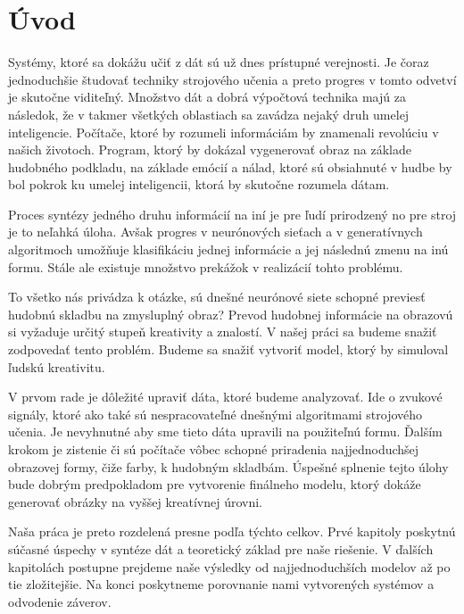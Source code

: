 

\chapter*{Úvod}

Systémy, ktoré sa dokážu učiť z dát sú už dnes prístupné verejnosti. Je čoraz jednoduchšie študovať techniky strojového učenia a preto progres v tomto odvetví je skutočne viditeľný. Množstvo dát a dobrá výpočtová technika majú za následok, že v takmer všetkých oblastiach sa zavádza nejaký druh umelej inteligencie. Počítače, ktoré by rozumeli informáciám by znamenali revolúciu v našich životoch. Program, ktorý by dokázal vygenerovať obraz na základe hudobného podkladu, na základe emócií a nálad, ktoré sú obsiahnuté v hudbe by bol pokrok ku umelej inteligencii, ktorá by skutočne rozumela dátam.

Proces syntézy jedného druhu informácií na iní je pre ľudí prirodzený no pre stroj je to neľahká úloha. Avšak progres v neurónových sieťach a v generatívnych algoritmoch umožňuje klasifikáciu jednej informácie a jej následnú zmenu na inú formu. Stále ale existuje množstvo prekážok v realizácií tohto problému.

To všetko nás privádza k otázke, sú dnešné neurónové siete schopné previesť hudobnú skladbu na zmysluplný obraz?
Prevod hudobnej informácie na obrazovú si vyžaduje určitý stupeň kreativity a znalostí. 
V našej práci sa budeme snažiť zodpovedať tento problém.
Budeme sa snažiť vytvoriť model, ktorý by simuloval ľudskú kreativitu.

V prvom rade je dôležité upraviť dáta, ktoré budeme analyzovať. Ide o zvukové signály, ktoré ako také sú nespracovateľné dnešnými algoritmami strojového učenia.
Je nevyhnutné aby sme tieto dáta upravili na použiteľnú formu.
Ďalším krokom je zistenie či sú počítače vôbec schopné priradenia najjednoduchšej obrazovej formy, čiže farby, k hudobným skladbám.
Úspešné splnenie tejto úlohy bude dobrým predpokladom pre vytvorenie finálneho modelu, ktorý dokáže generovať obrázky na vyššej kreatívnej úrovni.

Naša práca je preto rozdelená presne podľa týchto celkov.
Prvé kapitoly poskytnú súčasné úspechy v syntéze dát a teoretický základ pre naše riešenie.
V ďalších kapitolách postupne prejdeme naše výsledky od najjednoduchších modelov až po tie zložitejšie.
Na konci poskytneme porovnanie nami vytvorených systémov a odvodenie záverov.  
